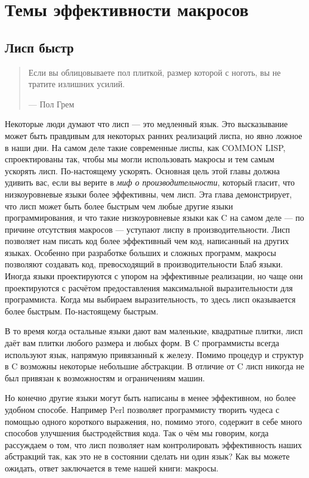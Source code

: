 \chapter{Темы эффективности макросов}\label{chapter_macro_efficiency_topics}
\section{Лисп быстр}\label{section_lisp_is_fast}
\begin{quote}
Если вы облицовываете пол плиткой, размер которой с ноготь, вы не тратите излишних усилий.

--- Пол Грем
\end {quote}


Некоторые люди думают что лисп --- это медленный язык. Это высказывание может быть правдивым для некоторых ранних реализаций лиспа, но явно ложное в наши дни. На самом деле такие современные лиспы, как COMMON LISP, спроектированы так, чтобы мы могли использовать макросы и тем самым ускорять лисп. По-настоящему ускорять. Основная цель этой главы должна удивить вас, если вы верите в \emph{миф о производительности}, который гласит, что низкоуровневые языки более эффективны, чем лисп. Эта глава демонстрирует, что лисп может быть более быстрым чем любые другие языки программирования, и что такие низкоуровневые языки как C на самом деле --- по причине отсутствия макросов --- уступают лиспу в производительности. Лисп позволяет нам писать код более эффективный чем код, написанный на других языках. Особенно при разработке больших и сложных программ, макросы позволяют создавать код, превосходящий в производительности Блаб языки. Иногда языки проектируются с упором на эффективные реализации, но чаще они проектируются с расчётом предоставления максимальной выразительности для программиста. Когда мы выбираем выразительность, то здесь лисп оказывается более быстрым. По-настоящему быстрым. 

В то время когда остальные языки дают вам маленькие, квадратные плитки, лисп даёт вам плитки любого размера и любых форм. В C программисты всегда используют язык, напрямую привязанный к железу. Помимо процедур и структур в C возможны некоторые небольшие абстракции. В отличие от C лисп никогда не был привязан к возможностям и ограничениям машин.

Но конечно другие языки могут быть написаны в менее эффективном, но более удобном способе. Например Perl позволяет программисту творить чудеса с помощью одного короткого выражения, но, помимо этого, содержит в себе много способов улучшения быстродействия кода. Так о чём мы говорим, когда рассуждаем о том, что лисп позволяет нам контролировать эффективность наших абстракций так, как это не в состоянии сделать ни один язык? Как вы можете ожидать, ответ заключается в теме нашей книги: макросы.

